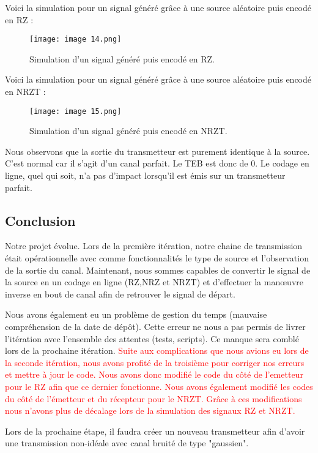 Voici la simulation pour un signal généré grâce à une source aléatoire puis encodé en RZ :

\begin{figure}[H]
    \centering
    \texttt{[image: image 14.png]}
    \caption{\label{fig:image14}Simulation d'un signal généré puis encodé en RZ.}
\end{figure}

Voici la simulation pour un signal généré grâce à une source aléatoire puis encodé en NRZT :

\begin{figure}[H]
    \centering
    \texttt{[image: image 15.png]}
    \caption{\label{fig:image15}Simulation d'un signal généré puis encodé en NRZT.}
\end{figure}

Nous observons que la sortie du transmetteur est purement identique à la source. C'est normal car il s'agit d'un canal parfait. Le TEB est donc de 0. Le codage en ligne, quel qui soit, n'a pas d'impact
lorsqu'il est émis sur un transmetteur parfait.

\subsection{Conclusion}

Notre projet évolue. Lors de la première itération, notre chaine de transmission était opérationnelle avec comme fonctionnalités le type de source et l'observation de la sortie du canal.
Maintenant, nous sommes capables de convertir le signal de la source en un codage en ligne (RZ,NRZ et NRZT) et d'effectuer la manœuvre inverse en bout de canal afin de retrouver le signal de départ.

Nous avons également eu un problème de gestion du temps (mauvaise compréhension de la date de dépôt). Cette erreur ne nous a pas permis de livrer l'itération avec l'ensemble des attentes (tests, scripts). Ce manque sera comblé lors de la prochaine itération.
\textcolor{red}{Suite aux complications que nous avions eu lors de la seconde itération, nous avons profité de la troisième pour corriger nos erreurs et mettre à jour le code. Nous avons donc modifié le code du côté de l'emetteur pour le RZ afin que ce dernier fonctionne. Nous avons également modifié les codes du côté de l'émetteur et du récepteur pour le NRZT. Grâce à ces modifications nous n'avons plus de décalage lors de la simulation des signaux RZ et NRZT.}

Lors de la prochaine étape, il faudra créer un nouveau transmetteur afin d'avoir une transmission non-idéale avec canal bruité de type "gaussien".